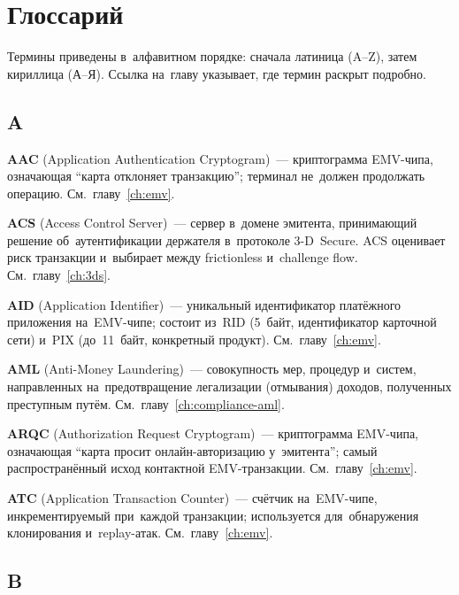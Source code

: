 
\chapter{Глоссарий}
\label{app:glossary}

Термины приведены в~алфавитном порядке: сначала латиница (A--Z),
затем кириллица (А--Я). Ссылка на~главу указывает, где термин
раскрыт подробно.



\section*{A}

\textbf{AAC} (Application Authentication Cryptogram)~---
криптограмма EMV-чипа, означающая \enquote{карта отклоняет
  транзакцию}; терминал не~должен продолжать
операцию. См.~главу~\ref{ch:emv}.

\textbf{ACS} (Access Control Server)~--- сервер в~домене
эмитента, принимающий решение об~аутентификации держателя
в~протоколе 3-D~Secure. ACS оценивает риск транзакции и~выбирает
между frictionless и~challenge flow. См.~главу~\ref{ch:3ds}.

\textbf{AID} (Application Identifier)~--- уникальный
идентификатор платёжного приложения на~EMV-чипе; состоит из~RID
(5~байт, идентификатор карточной сети) и~PIX (до~11~байт,
конкретный продукт). См.~главу~\ref{ch:emv}.

\textbf{AML} (Anti-Money Laundering)~--- совокупность мер,
процедур и~систем, направленных на~предотвращение легализации
(отмывания) доходов, полученных преступным
путём. См.~главу~\ref{ch:compliance-aml}.

\textbf{ARQC} (Authorization Request Cryptogram)~---
криптограмма EMV-чипа, означающая \enquote{карта просит
  онлайн-авторизацию у~эмитента}; самый распространённый исход
контактной EMV-транзакции. См.~главу~\ref{ch:emv}.

\textbf{ATC} (Application Transaction Counter)~--- счётчик
на~EMV-чипе, инкрементируемый при~каждой транзакции; используется
для~обнаружения клонирования и~replay-атак. См.~главу~\ref{ch:emv}.


\section*{B}

